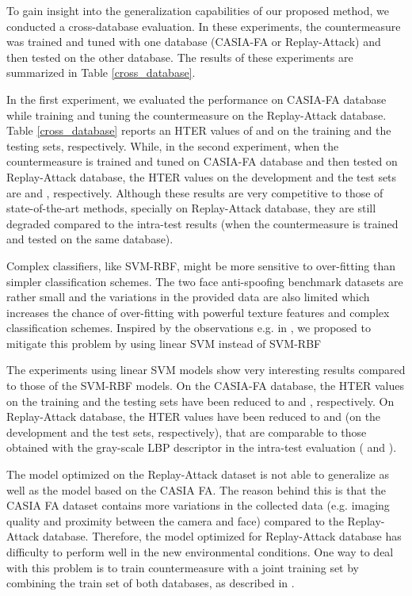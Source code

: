 \documentclass{article}
\begin{document}
	To gain insight into the generalization capabilities of our proposed method, we conducted a cross-database evaluation. In these experiments, the countermeasure was trained and tuned with one database (CASIA-FA or Replay-Attack) and then tested on the other database. The results of these experiments are summarized in Table \ref{cross_database}. 

In the first experiment, we evaluated the performance on  CASIA-FA database while training and tuning the countermeasure on the Replay-Attack database. Table \ref{cross_database} reports an HTER values of   and   on the training and the testing sets, respectively. While, in the second experiment, when the  countermeasure is trained and tuned on CASIA-FA database and then tested on Replay-Attack database, the HTER values on the development and the test sets are   and , respectively. Although these results are very competitive to  those of state-of-the-art methods, specially on Replay-Attack database, they are still degraded compared to the intra-test results (when the countermeasure is trained and tested on the same database).  

Complex classifiers, like SVM-RBF, might be more sensitive to over-fitting than simpler classification schemes. The two face anti-spoofing benchmark datasets are rather small and the variations in the provided data are also limited which increases the chance of over-fitting with powerful texture features and complex classification schemes. Inspired by the observations e.g. in \cite{replay} \cite{motion_lbp}, we proposed to mitigate this problem by using linear SVM instead of SVM-RBF

The experiments using linear SVM models show  very interesting  results compared to  those of the SVM-RBF models.  On the CASIA-FA database, the HTER values  on the training  and the testing  sets have been reduced to  and , respectively.  On Replay-Attack database, the HTER values have been reduced to  and  (on the development and the test sets, respectively), that are comparable to  those obtained with the gray-scale LBP descriptor in the intra-test evaluation ( and ). 

The model optimized on the Replay-Attack dataset is not able to generalize as well as the model based on the CASIA FA. The reason behind this is that the CASIA FA dataset contains more variations in the collected data (e.g. imaging quality and proximity between the camera and face) compared to the Replay-Attack database. Therefore, the model optimized for Replay-Attack database has difficulty to perform well in the new environmental conditions. One way to deal with this problem is to train countermeasure with a joint training set by combining the train set of both databases, as described in \cite{motion_casia}. 
\end{document}

